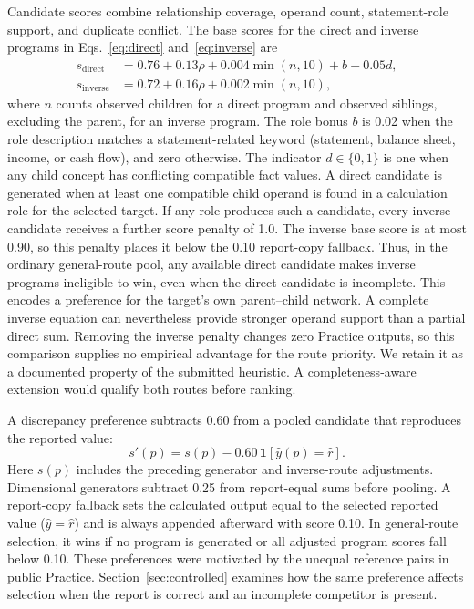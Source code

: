 \documentclass[conference]{IEEEtran}
\begin{document}
Candidate scores combine relationship coverage, operand count, statement-role support, and duplicate conflict. The base scores for the direct and inverse programs in Eqs.~\eqref{eq:direct} and~\eqref{eq:inverse} are
\begin{align}
s_{\mathrm{direct}}&=0.76+0.13\rho+0.004\min(n,10)+b-0.05d,
\label{eq:score-direct}\\
s_{\mathrm{inverse}}&=0.72+0.16\rho+0.002\min(n,10),
\label{eq:score-inverse}
\end{align}
where $n$ counts observed children for a direct program and observed siblings, excluding the parent, for an inverse program. The role bonus $b$ is 0.02 when the role description matches a statement-related keyword (statement, balance sheet, income, or cash flow), and zero otherwise. The indicator $d\in\{0,1\}$ is one when any child concept has conflicting compatible fact values. A direct candidate is generated when at least one compatible child operand is found in a calculation role for the selected target. If any role produces such a candidate, every inverse candidate receives a further score penalty of 1.0. The inverse base score is at most 0.90, so this penalty places it below the 0.10 report-copy fallback. Thus, in the ordinary general-route pool, any available direct candidate makes inverse programs ineligible to win, even when the direct candidate is incomplete. This encodes a preference for the target's own parent--child network. A complete inverse equation can nevertheless provide stronger operand support than a partial direct sum. Removing the inverse penalty changes zero Practice outputs, so this comparison supplies no empirical advantage for the route priority. We retain it as a documented property of the submitted heuristic. A completeness-aware extension would qualify both routes before ranking.

A discrepancy preference subtracts 0.60 from a pooled candidate that reproduces the reported value:
\begin{equation}
s'(p)=s(p)-0.60\,\mathbf{1}[\hat y(p)=\hat r].
\label{eq:discrepancy}
\end{equation}
Here $s(p)$ includes the preceding generator and inverse-route adjustments. Dimensional generators subtract 0.25 from report-equal sums before pooling. A report-copy fallback sets the calculated output equal to the selected reported value ($\hat y=\hat r$) and is always appended afterward with score 0.10. In general-route selection, it wins if no program is generated or all adjusted program scores fall below 0.10. These preferences were motivated by the unequal reference pairs in public Practice. Section~\ref{sec:controlled} examines how the same preference affects selection when the report is correct and an incomplete competitor is present.
\end{document}
